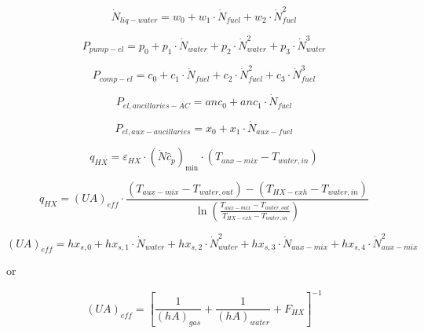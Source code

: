 \begin{equation}
{\dot N_{liq - water}} = {w_0} + {w_1} \cdot {\dot N_{fuel}} + {w_2} \cdot \dot N_{fuel}^2
\end{equation}

\begin{equation}
{P_{pump - el}} = {p_0} + {p_1} \cdot {\dot N_{water}} + {p_2} \cdot \dot N_{water}^2 + {p_3} \cdot \dot N_{water}^3
\end{equation}

\begin{equation}
{P_{comp - el}} = {c_0} + {c_1} \cdot {\dot N_{fuel}} + {c_2} \cdot \dot N_{fuel}^2 + {c_3} \cdot \dot N_{fuel}^3
\end{equation}

\begin{equation}
{P_{el,ancillaries - AC}} = an{c_0} + an{c_1} \cdot {\dot N_{fuel}}
\end{equation}

\begin{equation}
{P_{el,aux - ancillaries}} = {x_0} + {x_1} \cdot {\dot N_{aux - fuel}}
\end{equation}

\begin{equation}
{q_{HX}} = {\varepsilon_{HX}} \cdot {\left( {\dot N{{\hat c}_p}} \right)_{\min }} \cdot \left( {{T_{aux - mix}} - {T_{water,in}}} \right)
\end{equation}

\begin{equation}
{q_{HX}} = {\left( {UA} \right)_{eff}} \cdot \frac{{\left( {{T_{aux - mix}} - {T_{water,out}}} \right) - \left( {{T_{HX - exh}} - {T_{water,in}}} \right)}}{{\ln \left( {\frac{{{T_{aux - mix}} - {T_{water,out}}}}{{{T_{HX - exh}} - {T_{water,in}}}}} \right)}}
\end{equation}

\begin{equation}
{\left( {UA} \right)_{eff}} = h{x_{s,0}} + h{x_{s,1}} \cdot {\dot N_{water}} + h{x_{s,2}} \cdot \dot N_{water}^2 + h{x_{s,3}} \cdot {\dot N_{aux - mix}} + h{x_{s,4}} \cdot \dot N_{aux - mix}^2
\end{equation}

or

\begin{equation}
{\left( {UA} \right)_{eff}} = {\left[ {\frac{1}{{{{\left( {hA} \right)}_{gas}}}} + \frac{1}{{{{(hA)}_{water}}}} + {F_{HX}}} \right]^{ - 1}}
\end{equation}

